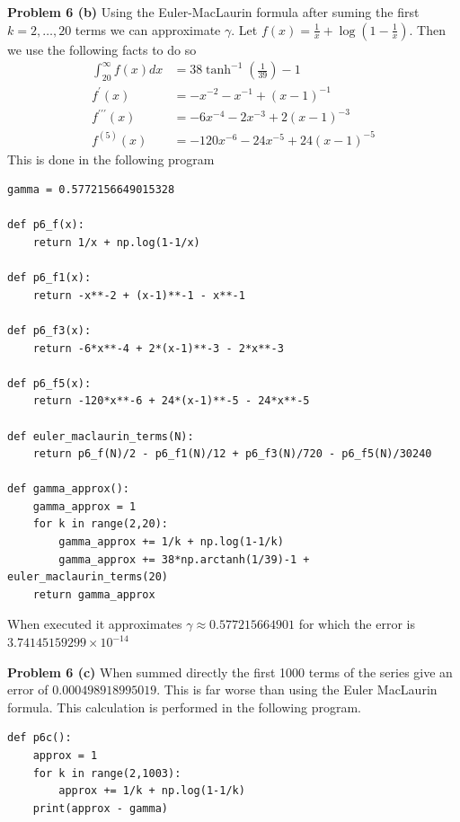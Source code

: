 \documentclass[12pt]{article}
\newcommand{\problem}[1]{\hspace{-4 ex} \large \textbf{Problem #1} }
\begin{document}
\bigbreak
\problem{6 (b)} Using the Euler-MacLaurin formula after suming the first $k=2, \dots,20$ terms we can approximate $\gamma$. Let $f(x) = \frac{1}{x} + \log(1-\tfrac{1}{x})$. Then we use the following facts to do so
\begin{align*}
	\int_20^\infty f(x) dx & = 38\tanh^{-1}(\tfrac{1}{39}) -1 \\
	f^\prime(x) & = -x^{-2} - x^{-1} + (x-1)^{-1} \\
	f^{\prime\prime\prime}(x) & = -6x^{-4} - 2x^{-3} + 2(x-1)^{-3} \\
	f^{(5)}(x) & = -120x^{-6} - 24x^{-5} + 24(x-1)^{-5}
\end{align*}
This is done in the following program
\begin{lstlisting}
gamma = 0.5772156649015328

def p6_f(x):
	return 1/x + np.log(1-1/x)
	
def p6_f1(x):
	return -x**-2 + (x-1)**-1 - x**-1
	
def p6_f3(x):
	return -6*x**-4 + 2*(x-1)**-3 - 2*x**-3
	
def p6_f5(x):
	return -120*x**-6 + 24*(x-1)**-5 - 24*x**-5
	
def euler_maclaurin_terms(N):
	return p6_f(N)/2 - p6_f1(N)/12 + p6_f3(N)/720 - p6_f5(N)/30240

def gamma_approx():
	gamma_approx = 1
	for k in range(2,20):
		gamma_approx += 1/k + np.log(1-1/k)
		gamma_approx += 38*np.arctanh(1/39)-1 + euler_maclaurin_terms(20)
	return gamma_approx
\end{lstlisting}

When executed it approximates $\gamma \approx 0.577215664901$ for which the error is $3.74145159299 \times 10^{-14}$

\bigbreak
\problem{6 (c)} When summed directly the first 1000 terms of the series give an error of $0.000498918995019$. This is far worse than using the Euler MacLaurin formula. This calculation is performed in the following program.

\begin{lstlisting}
def p6c():
	approx = 1
	for k in range(2,1003):
		approx += 1/k + np.log(1-1/k)
	print(approx - gamma)
\end{lstlisting}
\end{document}
